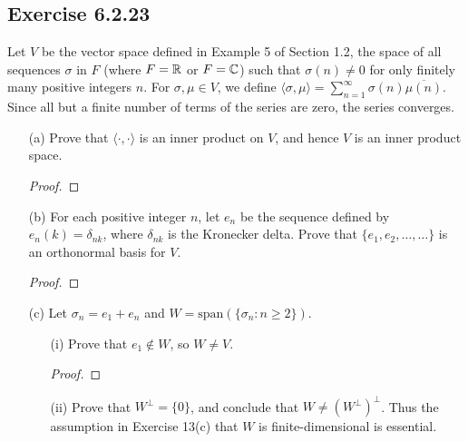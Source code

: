 \subsection*{Exercise 6.2.23} Let \( V  \) be the vector space defined in Example 5 of Section 1.2, the space of all sequences \( \sigma \) in \( F  \) (where \( F = \mathbb{R}  \) or \( F = \mathbb{C}  \)) such that \( \sigma(n) \neq 0  \) for only finitely many positive integers \( n  \). For \( \sigma, \mu \in V  \), we define \( \langle \sigma  , \mu \rangle = \sum_{ n=1  }^{ \infty   } \sigma(n) \overline{\mu(n)}.  \) Since all but a finite number of terms of the series are zero, the series converges.
\begin{enumerate}
    \item[(a)] Prove that \( \langle \cdot , \cdot \rangle \) is an inner product on \( V  \), and hence \( V  \) is an inner product space.
        \begin{proof}
        
        \end{proof}
    \item[(b)] For each positive integer \( n \), let \( {e}_{n} \) be the sequence defined by \( {e}_{n}(k) = {\delta}_{nk} \), where \( {\delta}_{nk}  \) is the Kronecker delta. Prove that \( \{ {e}_{1}, {e}_{2}, \dots, \dots \}  \) is an orthonormal basis for \( V  \).
        \begin{proof}
        
        \end{proof}
    \item[(c)] Let \( \sigma_n = {e}_{1} + {e}_{n} \) and \( W = \text{span}(\{ {\sigma}_{n}: n \geq 2 \} ) \).
        \begin{enumerate}
            \item[(i)] Prove that \( {e}_{1} \notin W  \), so \( W \neq V  \).
                \begin{proof}
                
                \end{proof}
            \item[(ii)] Prove that \( W^{\perp} = \{ 0  \}  \), and conclude that \( W \neq (W^{\perp})^{\perp}  \).
                Thus the assumption in Exercise 13(c) that \( W  \) is finite-dimensional is essential.
        \end{enumerate}
\end{enumerate}
